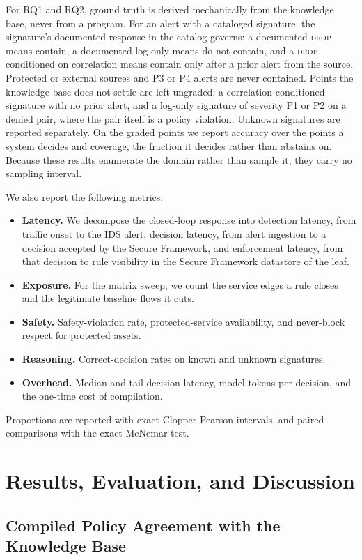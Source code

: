 \documentclass[final,5p]{elsarticle}
\begin{document}
For RQ1 and RQ2, ground truth is derived mechanically from the knowledge base, never from a program. For an alert with a cataloged signature, the signature's documented response in the catalog governs: a documented \textsc{drop} means contain, a documented log-only means do not contain, and a \textsc{drop} conditioned on correlation means contain only after a prior alert from the source. Protected or external sources and P3 or P4 alerts are never contained. Points the knowledge base does not settle are left ungraded: a correlation-conditioned signature with no prior alert, and a log-only signature of severity P1 or P2 on a denied pair, where the pair itself is a policy violation. Unknown signatures are reported separately. On the graded points we report accuracy over the points a system decides and coverage, the fraction it decides rather than abstains on. Because these results enumerate the domain rather than sample it, they carry no sampling interval.

We also report the following metrics.
\begin{itemize}
    \item \textbf{Latency.} We decompose the closed-loop response into detection latency, from traffic onset to the IDS alert, decision latency, from alert ingestion to a decision accepted by the Secure Framework, and enforcement latency, from that decision to rule visibility in the Secure Framework datastore of the leaf.
    \item \textbf{Exposure.} For the matrix sweep, we count the service edges a rule closes and the legitimate baseline flows it cuts.
    \item \textbf{Safety.} Safety-violation rate, protected-service availability, and never-block respect for protected assets.
    \item \textbf{Reasoning.} Correct-decision rates on known and unknown signatures.
    \item \textbf{Overhead.} Median and tail decision latency, model tokens per decision, and the one-time cost of compilation.
\end{itemize}
Proportions are reported with exact Clopper-Pearson intervals, and paired comparisons with the exact McNemar test.
\section{Results, Evaluation, and Discussion}
\label{sec:results_discussion}

\subsection{Compiled Policy Agreement with the Knowledge Base}
\label{sec:compiled_fidelity}
\end{document}

